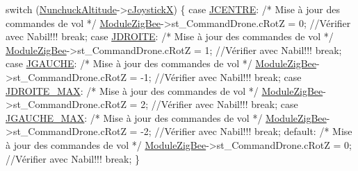 \begin{DoxyCode}
        \textcolor{keywordflow}{switch} (\hyperlink{classQBase_a615289f4d92be86986421ec16182ed90}{NunchuckAltitude}->\hyperlink{classNunchuck_ad9467642b97b8b008ddd137d273a22f8}{cJoystickX}) \{
        \textcolor{keywordflow}{case} \hyperlink{nunchuck_8h_ac63506adba6ed764c5061ac249623554}{JCENTRE}:
            \textcolor{comment}{/* Mise à jour des commandes de vol */}
            \hyperlink{classQBase_a466b6191fec7cd0029dfc547a5437752}{ModuleZigBee}->st\_CommandDrone.cRotZ = 0;    \textcolor{comment}{//Vérifier
       avec Nabil!!!}
            \textcolor{keywordflow}{break};
        \textcolor{keywordflow}{case} \hyperlink{nunchuck_8h_abb937f82823e628ca09a026777179226}{JDROITE}:
            \textcolor{comment}{/* Mise à jour des commandes de vol */}
            \hyperlink{classQBase_a466b6191fec7cd0029dfc547a5437752}{ModuleZigBee}->st\_CommandDrone.cRotZ = 1;    \textcolor{comment}{//Vérifier
       avec Nabil!!!}
            \textcolor{keywordflow}{break};
        \textcolor{keywordflow}{case} \hyperlink{nunchuck_8h_a2948a7fb931671c2935a67be056ec44d}{JGAUCHE}:
            \textcolor{comment}{/* Mise à jour des commandes de vol */}
            \hyperlink{classQBase_a466b6191fec7cd0029dfc547a5437752}{ModuleZigBee}->st\_CommandDrone.cRotZ = -1;    \textcolor{comment}{//Vérifier
       avec Nabil!!!}
            \textcolor{keywordflow}{break};
        \textcolor{keywordflow}{case} \hyperlink{nunchuck_8h_a13baf3bab74f21c7050fb8029bf5b871}{JDROITE\_MAX}:
            \textcolor{comment}{/* Mise à jour des commandes de vol */}
            \hyperlink{classQBase_a466b6191fec7cd0029dfc547a5437752}{ModuleZigBee}->st\_CommandDrone.cRotZ = 2;    \textcolor{comment}{//Vérifier
       avec Nabil!!!}
            \textcolor{keywordflow}{break};
        \textcolor{keywordflow}{case} \hyperlink{nunchuck_8h_a19f4efb3793bd7fd7da3a60339dc4631}{JGAUCHE\_MAX}:
            \textcolor{comment}{/* Mise à jour des commandes de vol */}
            \hyperlink{classQBase_a466b6191fec7cd0029dfc547a5437752}{ModuleZigBee}->st\_CommandDrone.cRotZ = -2;    \textcolor{comment}{//Vérifier
       avec Nabil!!!}
            \textcolor{keywordflow}{break};
        \textcolor{keywordflow}{default}:
            \textcolor{comment}{/* Mise à jour des commandes de vol */}
            \hyperlink{classQBase_a466b6191fec7cd0029dfc547a5437752}{ModuleZigBee}->st\_CommandDrone.cRotZ = 0;    \textcolor{comment}{//Vérifier
       avec Nabil!!!}
            \textcolor{keywordflow}{break};
        \}


\end{DoxyCode}
